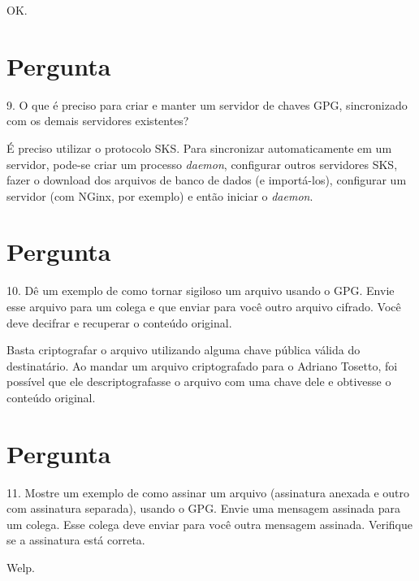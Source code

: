 \documentclass{article}
\begin{document}
    OK\@.

    \section{Pergunta}

    \begin{superframe}
        9. O que é preciso para criar e manter um servidor de chaves GPG,
        sincronizado com os demais servidores existentes?
    \end{superframe}

    É preciso utilizar o protocolo SKS. Para sincronizar automaticamente em um
    servidor, pode-se criar um processo \textit{daemon}, configurar outros
    servidores SKS, fazer o download dos arquivos de banco de dados (e
    importá-los), configurar um servidor (com NGinx, por exemplo) e então
    iniciar o \textit{daemon}.

    \section{Pergunta}

    \begin{superframe}
        10. Dê um exemplo de como tornar sigiloso um arquivo usando o GPG\@.
        Envie esse arquivo para um colega e que enviar para você outro arquivo
        cifrado. Você deve decifrar e recuperar o conteúdo original.
    \end{superframe}

    Basta criptografar o arquivo utilizando alguma chave pública válida do
    destinatário. Ao mandar um arquivo criptografado para o Adriano Tosetto,
    foi possível que ele descriptografasse o arquivo com uma chave dele e
    obtivesse o conteúdo original.

    \section{Pergunta}

    \begin{superframe}
        11. Mostre um exemplo de como assinar um arquivo (assinatura anexada e
        outro com assinatura separada), usando o GPG\@. Envie uma mensagem
        assinada para um colega. Esse colega deve enviar para você outra
        mensagem assinada. Verifique se a assinatura está correta.
    \end{superframe}

    Welp.
\end{document}
